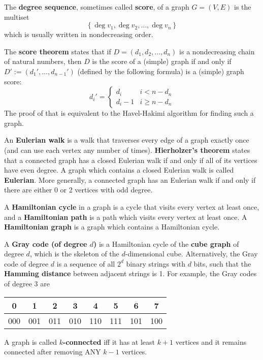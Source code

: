 \documentclass[10pt]{article}
\begin{document}
The \textbf{degree sequence}, sometimes called \textbf{score}, of a graph $G=(V,E)$ is the multiset
\[ \left\{ \operatorname{deg}v_1, \operatorname{deg}v_2, \dots, \operatorname{deg}v_n \right\} \]
which is usually written in nondecreasing order.
\par
The \textbf{score theorem} states that if $D=(d_1, d_2, \dots, d_n)$ is a nondecreasing chain of natural numbers, then $D$ is the score of a (simple) graph if and only if $D':=(d_1', \dots, d_{n-1}')$ (defined by the following formula) is a (simple) graph score:
\[ d_i' = \begin{cases}
    d_i & i < n-d_n \\
    d_i-1 & i \geq n-d_n
\end{cases} \]
The proof of that is equivalent to the Havel-Hakimi algorithm for finding such a graph.
\par
An \textbf{Eulerian walk} is a walk that traverses every edge of a graph exactly once (and can use each vertex any number of times). \textbf{Hierholzer's theorem} states that a connected graph has a closed Eulerian walk if and only if all of its vertices have even degree. A graph which contains a closed Eulerian walk is called \textbf{Eulerian}. More generally, a connected graph has an Eulerian walk if and only if there are either 0 or 2 vertices with odd degree.
\par
A \textbf{Hamiltonian cycle} in a graph is a cycle that visits every vertex at least once, and a \textbf{Hamiltonian path} is a path which visits every vertex at least once. A \textbf{Hamiltonian graph} is a graph which contains a Hamiltonian cycle.
\par
A \textbf{Gray code (of degree $d$)} is a Hamiltonian cycle of the \textbf{cube graph} of degree $d$, which is the skeleton of the $d$-dimensional cube. Alternatively, the Gray code of degree $d$ is a sequence of all $2^d$ binary strings with $d$ bits, such that the \textbf{Hamming distance} between adjacent strings is 1. For example, the Gray codes of degree 3 are
\begin{center}
    \begin{tabular}{|c| c| c| c| c| c| c| c|}
        \hline
        0 & 1 & 2 & 3 & 4 & 5 & 6 & 7 \\
        \hline
        000 & 001 & 011 & 010 & 110 & 111 & 101 & 100 \\
        \hline
    \end{tabular}
\end{center}
\par
A graph is called \textbf{$k$-connected} iff it has at least $k+1$ vertices and it remains connected after removing ANY $k-1$ vertices.
\end{document}
